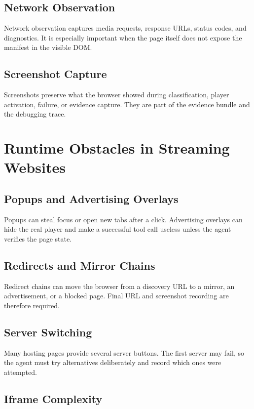 \subsection{Network Observation}

Network observation captures media requests, response URLs, status codes, and
diagnostics. It is especially important when the page itself does not expose
the manifest in the visible DOM.

\subsection{Screenshot Capture}

Screenshots preserve what the browser showed during classification, player
activation, failure, or evidence capture. They are part of the evidence bundle
and the debugging trace.

\section{Runtime Obstacles in Streaming Websites}

\subsection{Popups and Advertising Overlays}

Popups can steal focus or open new tabs after a click. Advertising overlays can
hide the real player and make a successful tool call useless unless the agent
verifies the page state.

\subsection{Redirects and Mirror Chains}

Redirect chains can move the browser from a discovery URL to a mirror, an
advertisement, or a blocked page. Final URL and screenshot recording are
therefore required.

\subsection{Server Switching}

Many hosting pages provide several server buttons. The first server may fail,
so the agent must try alternatives deliberately and record which ones were
attempted.

\subsection{Iframe Complexity}

